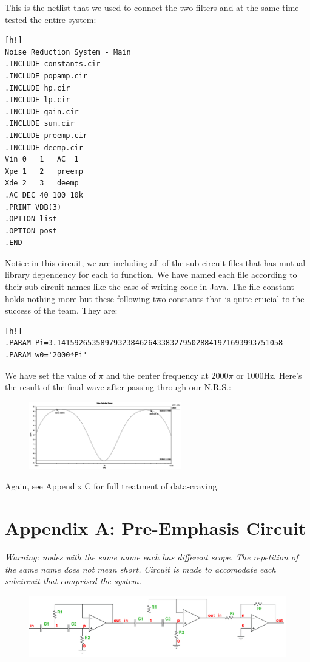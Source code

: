 \documentclass[a4paper]{IEEEtran}
\begin{document}
	This is the netlist that we used to connect the two filters and at the same time tested the entire system:
	\begin{center}
		\begin{lstlisting}[caption=NRS netlist.][h!]
Noise Reduction System - Main
.INCLUDE constants.cir
.INCLUDE popamp.cir
.INCLUDE hp.cir
.INCLUDE lp.cir
.INCLUDE gain.cir
.INCLUDE sum.cir
.INCLUDE preemp.cir
.INCLUDE deemp.cir
Vin	0	1	AC	1
Xpe	1	2	preemp
Xde	2	3	deemp
.AC DEC 40 100 10k
.PRINT VDB(3)
.OPTION list
.OPTION post
.END
		\end{lstlisting}
		\end{center}
		
	Notice in this circuit, we are including all of the sub-circuit files that has mutual library dependency for each to function. We have named each file according to their sub-circuit names like the case of writing code in Java. The file constant holds nothing more but these following two constants that is quite crucial to the success of the team. They are:
		\begin{center}
		\begin{lstlisting}[caption=System constants][h!]
.PARAM Pi=3.1415926535897932384626433832795028841971693993751058
.PARAM w0='2000*Pi'
		\end{lstlisting}
		\end{center}
	We have set the value of $\pi$ and the center frequency at $2000\pi$ or 1000Hz.
	Here's the result of the final wave after passing through our N.R.S.:
	
	\begin{figure}[h!]
		\begin{center}
			\includegraphics[width=250px]{nrs_plot.eps}
		\end{center}
	\end{figure}
	Again, see Appendix C for full treatment of data-craving.
		
		\pagebreak
		\onecolumn
		\section*{Appendix A: Pre-Emphasis Circuit}
		\it{Warning: nodes with the same name each has different scope. The repetition of the same name does not mean short. Circuit is made to accomodate each subcircuit that comprised the system.}
			\begin{figure}[h!]
				\begin{center}
					\includegraphics[width=\textwidth]{preemp.jpg} 
				\end{center}
			\end{figure}
\end{document}
